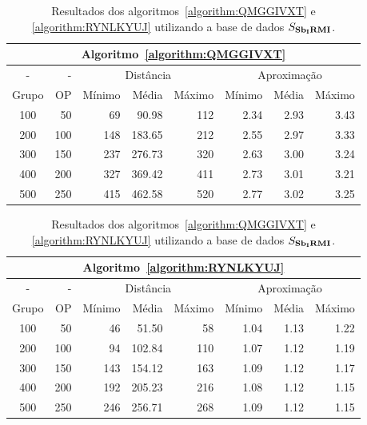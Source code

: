 \begin{table}[!htb]
  \caption{Resultados dos algoritmos~\ref{algorithm:QMGGIVXT} e \ref{algorithm:RYNLKYUJ} utilizando a base de dados $S_{\textbf{Sb\textsubscript{I}RMI}}{}$.}
  \label{table:GITKWJXD}
  \centering
  \begin{tabular}{|c|r|r|r|r|r|r|r|}
    \hline
    \multicolumn{8}{|c|}{Algoritmo~\ref{algorithm:QMGGIVXT}}                                                  \\ \hline
      -      &  -   & \multicolumn{3}{c|}{Distância}             & \multicolumn{3}{c|}{Aproximação}           \\ \hline
    Grupo    & OP   & Mínimo       & Média        & Máximo       & Mínimo       & Média        & Máximo       \\ \hline  
    100      & 50   & 69           &  90.98       & 112          & 2.34         & 2.93         & 3.43         \\ \hline
    200      & 100  & 148          & 183.65       & 212          & 2.55         & 2.97         & 3.33         \\ \hline
    300      & 150  & 237          & 276.73       & 320          & 2.63         & 3.00         & 3.24         \\ \hline
    400      & 200  & 327          & 369.42       & 411          & 2.73         & 3.01         & 3.21         \\ \hline
    500      & 250  & 415          & 462.58       & 520          & 2.77         & 3.02         & 3.25         \\ \hline    
  \end{tabular}

  \vspace{5mm}

  \begin{tabular}{|c|r|r|r|r|r|r|r|}
    \hline
    \multicolumn{8}{|c|}{Algoritmo~\ref{algorithm:RYNLKYUJ}}                                                  \\ \hline
      -      &  -   & \multicolumn{3}{c|}{Distância}             & \multicolumn{3}{c|}{Aproximação}           \\ \hline
    Grupo    & OP   & Mínimo       & Média        & Máximo       & Mínimo       & Média        & Máximo       \\ \hline  
    100      & 50   & 46           & 51.50        & 58           & 1.04         & 1.13         & 1.22         \\ \hline
    200      & 100  & 94           & 102.84       & 110          & 1.07         & 1.12         & 1.19         \\ \hline
    300      & 150  & 143          & 154.12       & 163          & 1.09         & 1.12         & 1.17         \\ \hline
    400      & 200  & 192          & 205.23       & 216          & 1.08         & 1.12         & 1.15         \\ \hline
    500      & 250  & 246          & 256.71       & 268          & 1.09         & 1.12         & 1.15         \\ \hline    
  \end{tabular}
\end{table}
